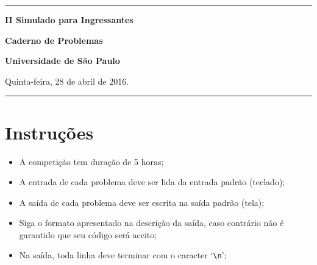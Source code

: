 \documentclass[a4paper,11pt]{article}
\begin{document}

\begin{center}
\noindent

\hrule

\vspace{3.0cm}

\begin{Huge}
  {\bf II Simulado para Ingressantes}
\end{Huge}

\vspace{6.0cm}

\begin{Huge}
{\bf Caderno de Problemas}
\end{Huge}

\vspace{6.0cm}

\begin{Large}
	{\bf Universidade de São Paulo}
\end{Large}

\vfill


Quinta-feira, 28 de abril de 2016.

\vfill
\hrule
\end{center}

\thispagestyle{empty}

\newpage

\section*{Instruções}

\begin{itemize}
	\item A competição tem duração de 5 horas;
	\item A entrada de cada problema deve ser lida da entrada padrão (teclado);
	\item A saída de cada problema deve ser escrita na saída padrão (tela);
	\item Siga o formato apresentado na descrição da saída, caso contrário não é garantido que seu
	código será aceito;
	\item Na saída, toda linha deve terminar com o caracter `\texttt{\textbackslash n}';
\end{itemize}

\vspace*{1.0cm}
\end{document}
